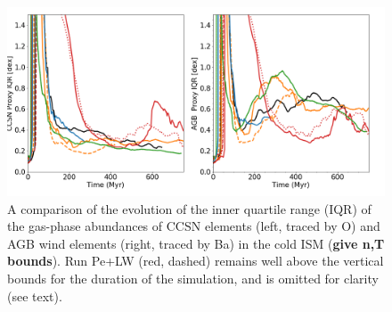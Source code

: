 \documentclass[twocolumn]{aastex62}
\newcommand{\pelwstyle}{red, dashed}
\begin{document}

\begin{figure}
  \centering
  \includegraphics[width=0.95\linewidth]{figures/physics_comparison_IQR}
  \caption{A comparison of the evolution of the inner quartile range (IQR) of the gas-phase abundances of CCSN elements (left, traced by O) and AGB wind elements (right, traced by Ba) in the cold ISM (\textbf{give n,T bounds}). Run Pe+LW (\pelwstyle) remains well above the vertical bounds for the duration of the simulation, and is omitted for clarity (see text).}
  \label{fig:mixing}
\end{figure}
\end{document}
